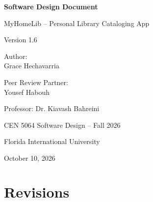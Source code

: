 \documentclass[12pt]{article}
\begin{document}
\begin{titlepage}
\centering

\vspace*{1cm}

{\Huge\textbf{Software Design Document}}

\vspace{0.5cm}

{\Large MyHomeLib -- Personal Library Cataloging App}

\vspace{2cm}

{\large Version 1.6}

\vspace{3cm}

Author:\\
Grace Hechavarria

\vspace{1cm}

Peer Review Partner:\\
Yousef Habouh

\vspace{2cm}

Professor: Dr. Kiavash Bahreini

\vspace{0.5cm}

CEN 5064 Software Design -- Fall 2026

\vspace{0.5cm}

Florida International University

\vfill

October 10, 2026

\end{titlepage}

\newpage

\section*{Revisions}
\end{document}
